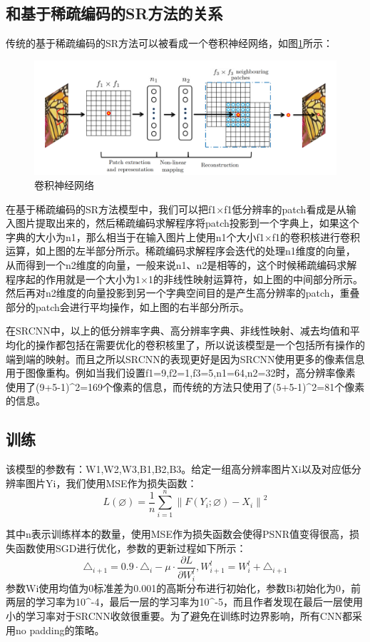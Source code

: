 \documentclass[UTF8,a4paper,10pt]{ctexrep}
\begin{document}
\subsection{和基于稀疏编码的SR方法的关系}
传统的基于稀疏编码的SR方法可以被看成一个卷积神经网络，如图\ref{fig:p3}所示：
\begin{figure}[H]
  \centering
  \includegraphics[scale=0.8]{figure/p3.png}
  \caption{卷积神经网络}
  \label{fig:p3}
\end{figure}
在基于稀疏编码的SR方法模型中，我们可以把f1×f1低分辨率的patch看成是从输入图片提取出来的，然后稀疏编码求解程序将patch投影到一个字典上，如果这个字典的大小为n1，那么相当于在输入图片上使用n1个大小f1×f1的卷积核进行卷积运算，如上图的左半部分所示。稀疏编码求解程序会迭代的处理n1维度的向量，从而得到一个n2维度的向量，一般来说n1、n2是相等的，这个时候稀疏编码求解程序起的作用就是一个大小为1×1的非线性映射运算符，如上图的中间部分所示。然后再对n2维度的向量投影到另一个字典空间目的是产生高分辨率的patch，重叠部分的patch会进行平均操作，如上图的右半部分所示。

在SRCNN中，以上的低分辨率字典、高分辨率字典、非线性映射、减去均值和平均化的操作都包括在需要优化的卷积核里了，所以说该模型是一个包括所有操作的端到端的映射。而且之所以SRCNN的表现更好是因为SRCNN使用更多的像素信息用于图像重构。例如当我们设置f1=9,f2=1,f3=5,n1=64,n2=32时，高分辨率像素使用了(9+5-1)\^{}2=169个像素的信息，而传统的方法只使用了(5+5-1)\^{}2=81个像素的信息。

\subsection{训练}

该模型的参数有：W1,W2,W3,B1,B2,B3。给定一组高分辨率图片Xi以及对应低分辨率图片Yi，我们使用MSE作为损失函数：
$$L(\varnothing)=\frac1n\sum_{i=1}^n\left\|F(Y_i;\varnothing)-X_i\right\|^2$$

其中n表示训练样本的数量，使用MSE作为损失函数会使得PSNR值变得很高，损失函数使用SGD进行优化，参数的更新过程如下所示：
$$\triangle_{i+1}=0.9\cdot\triangle_i-\mu\cdot\frac{\partial L}{\partial W_i^l},W_{i+1}^l=W_i^l+\triangle_{i+1}$$
参数Wi使用均值为0标准差为0.001的高斯分布进行初始化，参数Bi初始化为0，前两层的学习率为10\^{}-4，最后一层的学习率为10\^{}-5，而且作者发现在最后一层使用小的学习率对于SRCNN收敛很重要。为了避免在训练时边界影响，所有CNN都采用no padding的策略。
\end{document}
